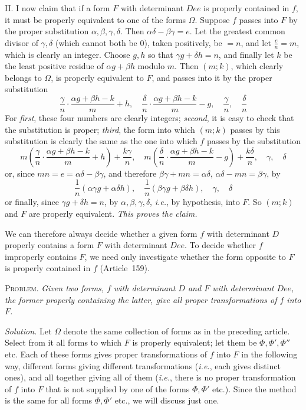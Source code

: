 II. I now claim that if a form $F$ with determinant $Dee$ is properly contained in $f$, it must be properly equivalent to one of the forms $\Omega$. Suppose $f$ passes into $F$ by the proper substitution $\alpha,\beta,\gamma,\delta$. Then $\alpha\delta-\beta\gamma=e$. Let the greatest common divisor of $\gamma,\delta$ (which cannot both be 0), taken positively, be $=n$, and let $\frac{e}{n}=m$, which is clearly an
integer. Choose $g,h$ so that $\gamma g+\delta h=n$, and finally let $k$ be the least positive residue of $\alpha g+\beta h$ modulo $m$. Then $(m;k)$, which clearly belongs to $\Omega$, is properly equivalent to $F$, and passes into it by the proper substitution
\[
\frac{\gamma}{n}\cdot\frac{\alpha g+\beta h-k}{m}+h,\quad
\frac{\delta}{n}\cdot\frac{\alpha g+\beta h-k}{m}-g,\quad
\frac{\gamma}{n},\quad\frac{\delta}{n}
\]
For \textit{first}, these four numbers are clearly integers; \textit{second}, it is easy to check that the substitution is proper; \textit{third}, the form into which $(m;k)$ passes by this substitution is clearly the same as the one into which $f$ passes by the substitution
\[
m\left(\frac{\gamma}{n}\cdot\frac{\alpha g+\beta h-k}{m}+h\right)+\frac{k\gamma}{n},\quad
m\left(\frac{\delta}{n}\cdot\frac{\alpha g+\beta h-k}{m}-g\right)+\frac{k\delta}{n},\quad\gamma,\quad\delta
\]
or, since $mn=e=\alpha\delta-\beta\gamma$, and therefore $\beta\gamma+mn=\alpha\delta$, $\alpha\delta-mn=\beta\gamma$, by
\[
\frac{1}{n}(\alpha\gamma g+\alpha\delta h),\quad
\frac{1}{n}(\beta\gamma g+\beta\delta h),\quad\gamma,\quad\delta
\]
or finally, since $\gamma g+\delta h=n$, by $\alpha,\beta,\gamma,\delta$, \textit{i.e.}, by hypothesis, into $F$. So $(m;k)$ and $F$ are properly equivalent. \textit{This proves the claim.}

We can therefore always decide whether a given form $f$ with determinant $D$ properly contains a form $F$ with determinant $Dee$. To decide whether $f$ improperly contains $F$, we need only investigate whether the form opposite to $F$ is properly contained in $f$ (Article~159).

\textsc{Problem.} \textit{Given two forms, $f$ with determinant $D$ and $F$ with determinant $Dee$, the former properly containing the latter, give all proper transformations of $f$ into $F$.}

\textit{Solution.} Let $\Omega$ denote the same collection of forms as in the preceding article. Select from it all forms to which $F$ is properly equivalent; let them be $\Phi,\Phi',\Phi''$ etc. Each of these forms gives proper transformations of $f$ into $F$ in the following way, different forms giving different transformations (\textit{i.e.}, each gives distinct ones), and all together giving all of them (\textit{i.e.}, there is no proper transformation of $f$ into $F$ that is not supplied by one of the forms $\Phi,\Phi'$ etc.). Since the method is the same for all forms $\Phi,\Phi'$ etc., we will discuss just one.

